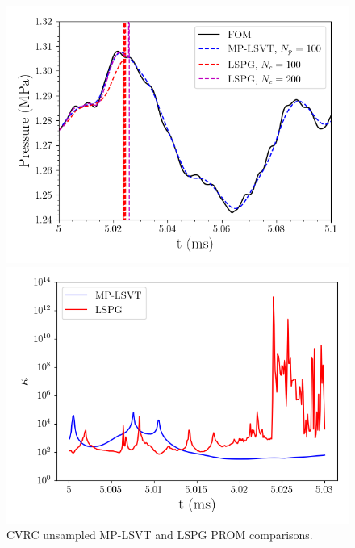 \begin{figure}
	\begin{minipage}{0.49\linewidth}
		\includegraphics[width=0.99\linewidth]{Chapters/CavityAndCVRC/Images/cvrc/unsampled/pressure_probe_unsampled_lspg.png}
	\end{minipage}
	\begin{minipage}{0.49\linewidth}
		\includegraphics[width=0.99\linewidth]{Chapters/CavityAndCVRC/Images/cvrc/unsampled/condition_number.png}
	\end{minipage}
	\caption{CVRC unsampled MP-LSVT and LSPG PROM comparisons.}
\end{figure}

